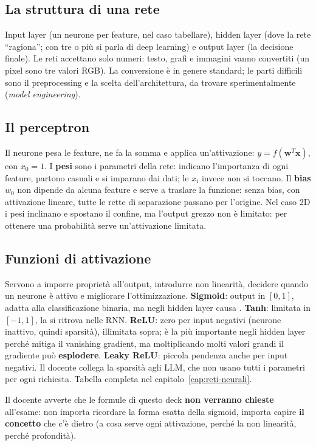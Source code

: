 \subsection{La struttura di una rete}
Input layer (un neurone per feature, nel caso tabellare), hidden layer (dove la rete ``ragiona''; con
tre o più si parla di deep learning) e output layer (la decisione finale). Le reti accettano solo
numeri: testo, grafi e immagini vanno convertiti (un pixel sono tre valori RGB). La conversione è
in genere standard; le parti difficili sono il preprocessing e la scelta dell'architettura, da trovare
sperimentalmente (\emph{model engineering}).

\subsection{Il perceptron}
Il neurone pesa le feature, ne fa la somma e applica un'attivazione: $y = f(\mathbf{w}^T\mathbf{x})$, con
$x_0 = 1$. I \textbf{pesi} sono i parametri della rete: indicano l'importanza di ogni feature,
partono casuali e si imparano dai dati; le $x_i$ invece non si toccano. Il \textbf{bias} $w_0$ non
dipende da alcuna feature e serve a traslare la funzione: senza bias, con attivazione lineare, tutte
le rette di separazione passano per l'origine. Nel caso 2D i pesi inclinano e spostano il confine,
ma l'output grezzo non è limitato: per ottenere una probabilità serve un'attivazione limitata.

\subsection{Funzioni di attivazione}
Servono a imporre proprietà all'output, introdurre non linearità, decidere quando un neurone è
attivo e migliorare l'ottimizzazione. \textbf{Sigmoid}: output in $[0,1]$, adatta alla classificazione
binaria, ma negli hidden layer causa . \textbf{Tanh}: limitata in $[-1,1]$, la
si ritrova nelle RNN. \textbf{ReLU}: zero per input negativi (neurone inattivo, quindi sparsità),
illimitata sopra; è la più importante negli hidden layer perché mitiga il vanishing gradient, ma
moltiplicando molti valori grandi il gradiente può \textbf{esplodere}. \textbf{Leaky ReLU}: piccola
pendenza anche per input negativi. Il docente collega la sparsità agli LLM, che non usano tutti i
parametri per ogni richiesta. Tabella completa nel capitolo~\ref{cap:reti-neurali}.

\begin{esame}
Il docente avverte che le formule di questo deck \textbf{non verranno chieste} all'esame: non
importa ricordare la forma esatta della sigmoid, importa capire \textbf{il concetto} che c'è dietro
(a cosa serve ogni attivazione, perché la non linearità, perché profondità).
\end{esame}

